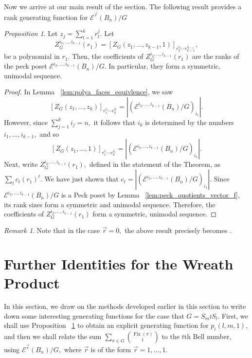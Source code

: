 \documentclass[10 pt]{amsart}
\theoremstyle{plain}
\theoremstyle{definition}
\theoremstyle{remark}
\numberwithin{equation}{section}
\newtheorem{prop}[thm]{Proposition}
\theoremstyle{remark}
\newtheorem{rem}[thm]{Remark}
\renewcommand{\vec}[1]{\overrightarrow{#1}}
\def\Fix{\operatorname{Fix}}
\begin{document}
Now we arrive at our main result of the section. The following result provides a rank generating function for $\mathcal E^{\vec r}(B_n)/G$

\begin{prop}
\label{prop:rank_gen_fn}
Let $z_j = \sum_{l = 1}^k r_l^j.$ Let $$Z_G^{i_2,\ldots,i_{k-1}}(r_1) =[Z_G(z_1,\ldots, z_{k-1},1)]_{r_2^{i_2}\cdots r_{k-1}^{i_{k-1}}},$$ be a polynomial in $r_1.$ Then, the coefficients of $Z_G^{i_2,\ldots,i_{k-1}}(r_1)$ are the ranks of the peck poset  $\mathcal E^{i_2,\ldots, i_{k-1}}(B_n)/G.$ In particular, they form a symmetric, unimodal sequence.
\end{prop}
\begin{proof}
In Lemma ~\ref{lem:polya_faces_equivlence}, we saw $$[Z_G(z_1,\ldots, z_k)]_{r_1^{i_1} \cdots r_k^{i_k}}=|(\mathcal E^{i_2,\ldots, i_{k-1}}(B_n)/G)_{i_1}|.$$
However, since $\sum_{j = 1}^k i_j = n,$ it follows that $i_k$ is determined by the numbers $i_1,\ldots, i_{k-1},$ and so 
$$[Z_G(z_1,\ldots, 1)]_{r_1^{i_1} \cdots r_k^{i_k}}=|(\mathcal E^{i_2,\ldots, i_{k-1}}(B_n)/G)_{i_1}|.$$
Next, write $Z_G^{i_2,\ldots,i_{k-1}}(r_1),$ defined in the statement of the Theorem, as $\sum_{t} c_t (r_1)^t.$ We have just shown that $c_t = |(\mathcal E^{i_2,\ldots, i_{k-1}}(B_n)/G)_{i_1}|.$ Since $\mathcal E^{i_2,\ldots, i_{k-1}}(B_n)/G$ is a Peck poset by Lemma ~\ref{lem:peck_quotients_vector_f}, its rank sizes form a symmetric and unimodal sequence. Therefore, the coefficients of $Z_G^{i_2,\ldots,i_{k-1}}(r_1)$ form a symmetric, unimodal sequence.
\end{proof}

\begin{rem}
Note that in the case $\vec r = 0,$ the above result precisely becomes \cite[Corollary 7.16]{algebraic_stanley}.
\end{rem}

\section{Further Identities for the Wreath Product}
In this section, we draw on the methods developed earlier in this section to write down some interesting generating functions for the case that $G = S_m \wr S_l.$
First, we shall use Proposition ~\ref{prop:rank_gen_fn} to obtain an explicit generating function for $p_i(l,m,1),$ and then we shall relate the sum $\sum_{\pi \in G} \binom{\Fix(\pi)}{t}$ to the $t$th Bell number, using $\mathcal E^{\vec r}(B_n)/G,$ where $\vec r$ is of the form $\vec r = 1,\ldots, 1$.
\end{document}
